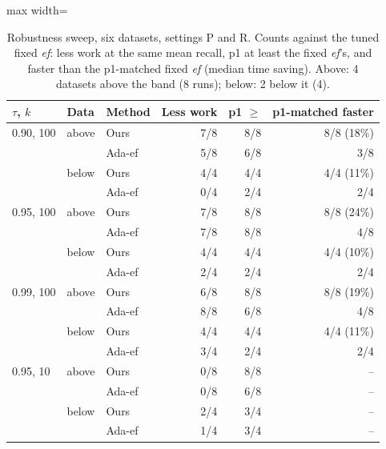 \documentclass[10pt,journal,compsoc]{IEEEtran}
\newcommand{\ef}{\textit{ef}}
\begin{document}
\begin{table}[t]
  \caption{Robustness sweep, six datasets, settings P and R. Counts against the tuned fixed \ef{}:
  less work at the same mean recall, p1 at least the fixed \ef{}'s, and faster than the p1-matched
  fixed \ef{} (median time saving). Above: 4 datasets above the band (8 runs); below: 2 below it (4).}
  \label{tab:sweep}
  \centering\footnotesize\setlength{\tabcolsep}{3.5pt}
  \begin{adjustbox}{max width=\linewidth}\begin{tabular}{lllrrr}
    \toprule
    $\tau$, $k$ & Data & Method & Less work & p1 $\geq$ & p1-matched faster \\
    \midrule
    0.90, 100 & above & Ours   & 7/8 & 8/8 & 8/8 (18\%) \\
              &       & Ada-ef & 5/8 & 6/8 & 3/8 \\
              & below & Ours   & 4/4 & 4/4 & 4/4 (11\%) \\
              &       & Ada-ef & 0/4 & 2/4 & 2/4 \\
    \midrule
    0.95, 100 & above & Ours   & 7/8 & 8/8 & 8/8 (24\%) \\
              &       & Ada-ef & 7/8 & 8/8 & 4/8 \\
              & below & Ours   & 4/4 & 4/4 & 4/4 (10\%) \\
              &       & Ada-ef & 2/4 & 2/4 & 2/4 \\
    \midrule
    0.99, 100 & above & Ours   & 6/8 & 8/8 & 8/8 (19\%) \\
              &       & Ada-ef & 8/8 & 6/8 & 4/8 \\
              & below & Ours   & 4/4 & 4/4 & 4/4 (11\%) \\
              &       & Ada-ef & 3/4 & 2/4 & 2/4 \\
    \midrule
    0.95, 10  & above & Ours   & 0/8 & 8/8 & -- \\
              &       & Ada-ef & 0/8 & 6/8 & -- \\
              & below & Ours   & 2/4 & 3/4 & -- \\
              &       & Ada-ef & 1/4 & 3/4 & -- \\
    \bottomrule
  \end{tabular}\end{adjustbox}
\end{table}
\end{document}
